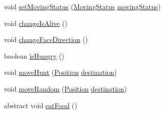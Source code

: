 \begin{DoxyCompactItemize}
\item 
void \mbox{\hyperlink{class_fish_afcc56cacfeded2fb41f3de811aff9d45}{set\+Moving\+Status}} (\mbox{\hyperlink{enum_moving_object_1_1_moving_status}{Moving\+Status}} \mbox{\hyperlink{class_fish_adb3e06c4c9cfd4e55a7d819c50702521}{moving\+Status}})
\item 
void \mbox{\hyperlink{class_fish_a88fa149bd62388b1aee597c9ec540369}{change\+Is\+Alive}} ()
\item 
void \mbox{\hyperlink{class_fish_a9fb18733f43c29b1a4c4b16a6322aec6}{change\+Face\+Direction}} ()
\item 
boolean \mbox{\hyperlink{class_fish_aa4d669d1ffe1655a62c8b9ea5c477d72}{is\+Hungry}} ()
\item 
void \mbox{\hyperlink{class_fish_a8ac2c9963873520d435ee1609dae0174}{move\+Hunt}} (\mbox{\hyperlink{class_position}{Position}} \mbox{\hyperlink{class_fish_a93523126df751dd0301a1fcf2ed42735}{destination}})
\item 
void \mbox{\hyperlink{class_fish_aa3683716f71b574717c30f0f7be3ec33}{move\+Random}} (\mbox{\hyperlink{class_position}{Position}} \mbox{\hyperlink{class_fish_a93523126df751dd0301a1fcf2ed42735}{destination}})
\item 
abstract void \mbox{\hyperlink{class_fish_af226ad690f56674f1b08d9d9562dde83}{eat\+Food}} ()
\end{DoxyCompactItemize}
